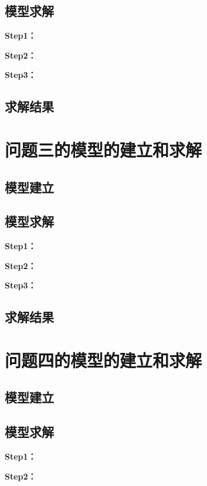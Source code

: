 \documentclass[withoutpreface]{njtechmcmthesis}
\begin{document}
\subsection{模型求解}

\textbf{Step1：} 

\textbf{Step2：} 

\textbf{Step3：} 

\subsection{求解结果}


\section{问题三的模型的建立和求解}
\subsection{模型建立}

\subsection{模型求解}

\textbf{Step1：} 

\textbf{Step2：} 

\textbf{Step3：} 

\subsection{求解结果}


\section{问题四的模型的建立和求解}
\subsection{模型建立}

\subsection{模型求解}

\textbf{Step1：} 

\textbf{Step2：} 
\end{document}
